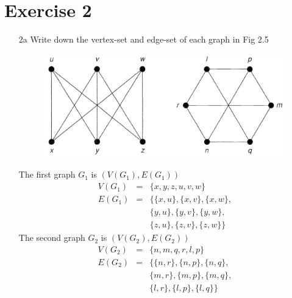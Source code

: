 \documentclass[12pt,a4paper, twocolumn]{article}
\begin{document}
\section*{Exercise 2}
\begin{itemize}
	\item[2a] {\color{blue} Write down the vertex-set and edge-set of each graph in Fig 2.5}
	\begin{figure}[h!]
	\centering
	\includegraphics[scale=0.5]{figures/isomorphism1.png}
	\end{figure}
	\hsplit
	
	The first graph $G_1$ is $(V(G_1), E(G_1))$
	\begin{eqnarray*}
	V(G_1) & = & \{ x, y, z, u, v, w\}\\
	E(G_1) & = &	 \{ \{x, u\}, \{x, v\}, \{x, w\}, \\
				  & &    \{y, u\}, \{y, v\}, \{y, w\}, \\ 
				  & &    \{z, u\}, \{z, v\}, \{z, w\} \}
	\end{eqnarray*}
	The second graph $G_2$ is $(V(G_2), E(G_2))$
	\begin{eqnarray*}
	V(G_2) & = & \{ n, m, q, r, l, p\}\\
	E(G_2) & = &	 \{ \{n, r\}, \{n, p\}, \{n, q\}, \\
				  & &    \{m, r\}, \{m, p\}, \{m, q\}, \\ 
				  & &    \{l, r\}, \{l, p\}, \{l, q\} \}
	\end{eqnarray*}
	

\end{itemize}
\end{document}

